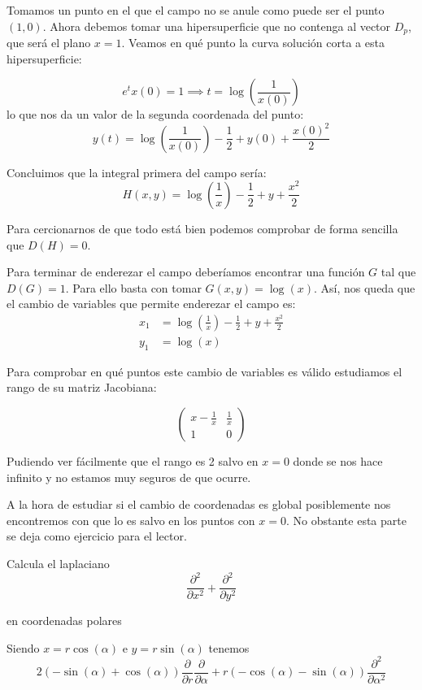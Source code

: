 \begin{problem}[5]
Tomamos un punto en el que el campo no se anule como puede ser el punto $(1,0)$. Ahora debemos tomar una hipersuperficie que no contenga al vector $D_p$, que será el plano $x=1$. Veamos en qué punto la curva solución corta a esta hipersuperficie:

\[e^t x(0)= 1 \implies t = \log\left(\frac{1}{x(0)}\right)\]
lo que nos da un valor de la segunda coordenada del punto:
\[y(t)=\log\left(\frac{1}{x(0)}\right)-\frac{1}{2}+y(0)+\frac{x(0)^2}{2}\]

Concluimos que la integral primera del campo sería:
\[H(x,y)=\log\left(\frac{1}{x}\right)-\frac{1}{2}+y+\frac{x^2}{2}\]

Para cercionarnos de que todo está bien podemos comprobar de forma sencilla que $D(H)=0$.

Para terminar de enderezar el campo deberíamos encontrar una función $G$ tal que $D(G)=1$. Para ello basta con tomar $G(x,y)=\log(x)$. Así, nos queda que el cambio de variables que permite enderezar el campo es:
\begin{align}
x_1 &= \log\left(\frac{1}{x}\right)-\frac{1}{2}+y+\frac{x^2}{2} \\
y_1 &= \log(x)
\end{align}

Para comprobar en qué puntos este cambio de variables es válido estudiamos el rango de su matriz Jacobiana:

\[\left( \begin{array}{cc}
x-\frac{1}{x} & \frac{1}{x}  \\
1 & 0  \end{array} \right)\]

Pudiendo ver fácilmente que el rango es 2 salvo en $x=0$ donde se nos hace infinito y no estamos muy seguros de que ocurre.

A la hora de estudiar si el cambio de coordenadas es global posiblemente nos encontremos con que lo es salvo en los puntos con $x=0$. No obstante esta parte se deja como ejercicio para el lector.
\end{problem}

\begin{problem}[6]
Calcula el laplaciano
\[\frac{\partial^2}{\partial x^2}+\frac{\partial^2}{\partial y^2}\]

en coordenadas polares

\solution
\yoP

Siendo $x=r\cos(α)$ e $y=r\sin(α)$ tenemos
\[2(-\sin(α)+\cos(α))\frac{\partial}{\partial r}\frac{\partial}{\partial α}+r(-\cos(α)-\sin(α))\frac{\partial^2}{\partial α^2}\]
\end{problem}

